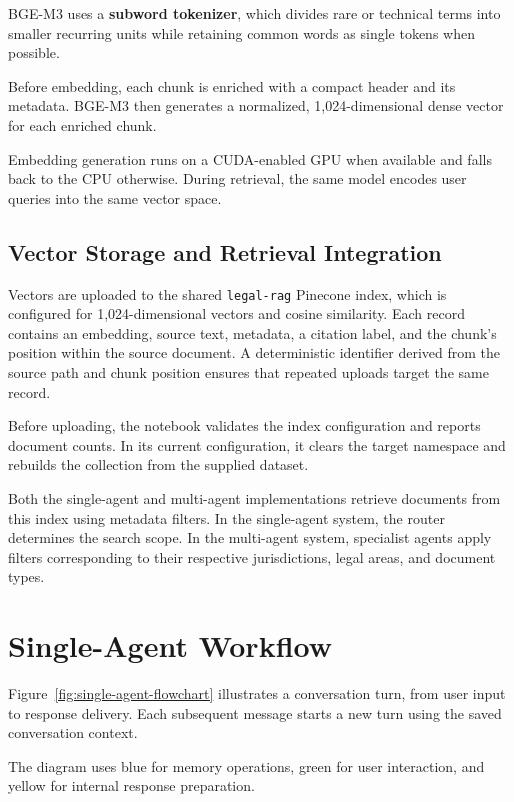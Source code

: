 \documentclass[a4paper,12pt]{report}
\begin{document}
BGE-M3 uses a \textbf{subword tokenizer}, which divides rare or
technical terms into smaller recurring units while retaining common
words as single tokens when possible.

Before embedding, each chunk is enriched with a compact header
and its metadata. BGE-M3 then generates a normalized,
1,024-dimensional dense vector for each enriched chunk.

Embedding generation runs on a CUDA-enabled GPU when available
and falls back to the CPU otherwise. During retrieval, the same
model encodes user queries into the same vector space.

\subsection{Vector Storage and Retrieval Integration}

Vectors are uploaded to the shared \texttt{legal-rag} Pinecone
index, which is configured for 1,024-dimensional vectors and
cosine similarity. Each record contains an embedding, source text,
metadata, a citation label, and the chunk's position within the
source document. A deterministic identifier derived from the source
path and chunk position ensures that repeated uploads target the
same record.

Before uploading, the notebook validates the index configuration
and reports document counts. In its current configuration, it clears
the target namespace and rebuilds the collection from the supplied
dataset.

Both the single-agent and multi-agent implementations retrieve
documents from this index using metadata filters. In the
single-agent system, the router determines the search scope.
In the multi-agent system, specialist agents apply filters
corresponding to their respective jurisdictions, legal areas,
and document types.





\section{Single-Agent Workflow}
\label{sec:single-agent-workflow}

Figure~\ref{fig:single-agent-flowchart} illustrates a conversation turn,
from user input to response delivery. Each subsequent message starts
a new turn using the saved conversation context.

The diagram uses blue for memory operations, green for user
interaction, and yellow for internal response preparation.
\end{document}
